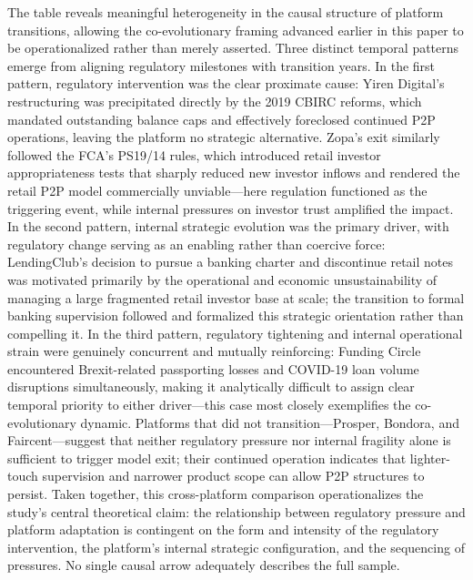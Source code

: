 \documentclass[pdflatex,sn-apa]{sn-jnl}%
\theoremstyle{thmstyleone}%
\theoremstyle{thmstyletwo}%
\theoremstyle{thmstylethree}%
\begin{document}
\textcolor{NavyBlue}{The table reveals meaningful heterogeneity in the causal structure of platform transitions, allowing the co-evolutionary framing advanced earlier in this paper to be operationalized rather than merely asserted. Three distinct temporal patterns emerge from aligning regulatory milestones with transition years. In the first pattern, regulatory intervention was the clear proximate cause: Yiren Digital's restructuring was precipitated directly by the 2019 CBIRC reforms, which mandated outstanding balance caps and effectively foreclosed continued P2P operations, leaving the platform no strategic alternative. Zopa's exit similarly followed the FCA's PS19/14 rules, which introduced retail investor appropriateness tests that sharply reduced new investor inflows and rendered the retail P2P model commercially unviable—here regulation functioned as the triggering event, while internal pressures on investor trust amplified the impact. In the second pattern, internal strategic evolution was the primary driver, with regulatory change serving as an enabling rather than coercive force: LendingClub's decision to pursue a banking charter and discontinue retail notes was motivated primarily by the operational and economic unsustainability of managing a large fragmented retail investor base at scale; the transition to formal banking supervision followed and formalized this strategic orientation rather than compelling it. In the third pattern, regulatory tightening and internal operational strain were genuinely concurrent and mutually reinforcing: Funding Circle encountered Brexit-related passporting losses and COVID-19 loan volume disruptions simultaneously, making it analytically difficult to assign clear temporal priority to either driver—this case most closely exemplifies the co-evolutionary dynamic. Platforms that did not transition—Prosper, Bondora, and Faircent—suggest that neither regulatory pressure nor internal fragility alone is sufficient to trigger model exit; their continued operation indicates that lighter-touch supervision and narrower product scope can allow P2P structures to persist. Taken together, this cross-platform comparison operationalizes the study's central theoretical claim: the relationship between regulatory pressure and platform adaptation is contingent on the form and intensity of the regulatory intervention, the platform's internal strategic configuration, and the sequencing of pressures. No single causal arrow adequately describes the full sample.}
\end{document}
